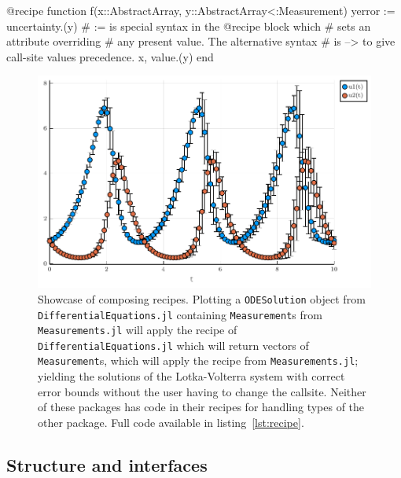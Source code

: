 \begin{code}[caption={\texttt{Measurements.jl} recipe}, label={lst:measurements}]
@recipe function f(x::AbstractArray, y::AbstractArray{<:Measurement})
    yerror := uncertainty.(y)       # := is special syntax in the @recipe block which
                                    # sets an attribute overriding
                                    # any present value. The alternative syntax
                                    # is --> to give call-site values precedence.
    x, value.(y)
end
\end{code}

\begin{figure}[H]
    \centering
    \includegraphics[width=\textwidth]{./fig/DiffEq_3Measurements.pdf}
    \caption{
        Showcase of composing recipes.
        Plotting a \texttt{ODESolution} object from \texttt{DifferentialEquations.jl} containing \texttt{Measurement}s from \texttt{Measurements.jl} will apply the recipe of \texttt{DifferentialEquations.jl} which will return vectors of \texttt{Measurement}s, which will apply the recipe from \texttt{Measurements.jl}; yielding the solutions of the Lotka-Volterra system\cite{alfredj.lotkaElementsPhysicalBiology1925} with correct error bounds without the user having to change the callsite.
        Neither of these packages has code in their recipes for handling types of the other package.
        Full code available in listing~\ref{lst:recipe}.
    }
    \label{fig:DiffEqM}
\end{figure}


\subsection*{Structure and interfaces}

